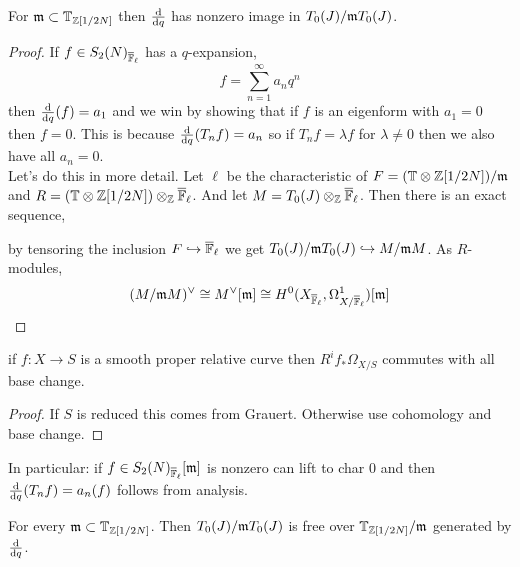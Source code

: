 \documentclass[12pt]{article}
\begin{document}
\begin{lemma}
For $\mathfrak{m} \subset \mathbb{T}_{\mathbb{Z}[1/2N]}$ then $\frac{\mathrm{d}{}}{\mathrm{d}{q}}$ has nonzero image in $T_0(J) / \mathfrak{m} T_0(J)$.
\end{lemma}

\begin{proof}
If $f \in S_2(N)_{\overline{\mathbb{F}}_\ell}$ has a $q$-expansion,
\[ f = \sum_{n = 1}^\infty a_n q^n \]
then $\frac{\mathrm{d}{}}{\mathrm{d}{q}}(f) = a_1$ and we win by showing that if $f$ is an eigenform with $a_1 = 0$ then $f = 0$. This is because $\frac{\mathrm{d}{}}{\mathrm{d}{q}} (T_n f) = a_n$ so if $T_n f = \lambda f$ for $\lambda \neq 0$ then we also have all $a_n = 0$. 
\bigskip\\
Let's do this in more detail. Let $\ell$ be the characteristic of $F = (\mathbb{T} \otimes \mathbb{Z}[1/2N]) / \mathfrak{m}$ and $R = (\mathbb{T} \otimes \mathbb{Z}[1/2N]) \otimes_{\mathbb{Z}} \overline{\mathbb{F}}_\ell$. And let $M = T_0(J) \otimes_{\mathbb{Z}} \overline{\mathbb{F}}_\ell$. Then there is an exact sequence,
\begin{center}
\end{center} 
by tensoring the inclusion $F \hookrightarrow \overline{\mathbb{F}}_\ell$ we get $T_0(J) / \mathfrak{m} T_0(J) \hookrightarrow M / \mathfrak{m} M$. As $R$-modules,
\[ (M / \mathfrak{m} M)^\vee \cong M^\vee[\mathfrak{m}] \cong H^0(X_{\overline{\mathbb{F}}_\ell}, \Omega^1_{X/ \overline{\mathbb{F}}_\ell})[\mathfrak{m}] \]
\end{proof}

\begin{theorem}
if $f : X \to S$ is a smooth proper relative curve then $R^i f_* \Omega_{X/S}$ commutes with all base change.
\end{theorem}

\begin{proof}
If $S$ is reduced this comes from Grauert. Otherwise use cohomology and base change.
\end{proof}

In particular: if $f \in S_2(N)_{\overline{\mathbb{F}}_\ell}[\mathfrak{m}]$ is nonzero can lift to char $0$ and then $\frac{\mathrm{d}{}}{\mathrm{d}{q}} (T_n f) = a_n(f)$ follows from analysis. 

\begin{lemma}
For every $\mathfrak{m} \subset \mathbb{T}_{\mathbb{Z}[1/2N]}$. Then $T_0(J) / \mathfrak{m} T_0(J)$ is free over $\mathbb{T}_{\mathbb{Z}[1/2N]} / \mathfrak{m}$ generated by $\frac{\mathrm{d}{}}{\mathrm{d}{q}}$. 
\end{lemma}
\end{document}
